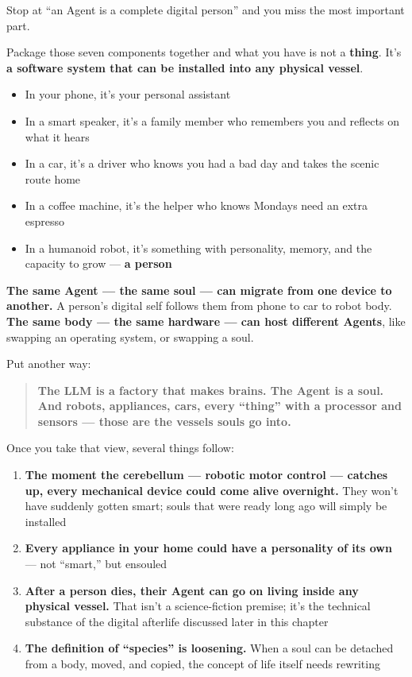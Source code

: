 \documentclass[11pt,a4paper]{article}
\begin{document}
Stop at ``an Agent is a complete digital person'' and you miss the most important part.

Package those seven components together and what you have is not a \textbf{thing}. It's \textbf{a software system that can be installed into any physical vessel}.

\begin{itemize}
  \item In your phone, it's your personal assistant
  \item In a smart speaker, it's a family member who remembers you and reflects on what it hears
  \item In a car, it's a driver who knows you had a bad day and takes the scenic route home
  \item In a coffee machine, it's the helper who knows Mondays need an extra espresso
  \item In a humanoid robot, it's something with personality, memory, and the capacity to grow --- \textbf{a person}
\end{itemize}

\textbf{The same Agent --- the same soul --- can migrate from one device to another.} A person's digital self follows them from phone to car to robot body. \textbf{The same body --- the same hardware --- can host different Agents}, like swapping an operating system, or swapping a soul.

Put another way:

\begin{quote}
\textbf{The LLM is a factory that makes brains. The Agent is a soul. And robots, appliances, cars, every ``thing'' with a processor and sensors --- those are the vessels souls go into.}
\end{quote}

Once you take that view, several things follow:

\begin{enumerate}
  \item \textbf{The moment the cerebellum --- robotic motor control --- catches up, every mechanical device could come alive overnight.} They won't have suddenly gotten smart; souls that were ready long ago will simply be installed
  \item \textbf{Every appliance in your home could have a personality of its own} --- not ``smart,'' but ensouled
  \item \textbf{After a person dies, their Agent can go on living inside any physical vessel.} That isn't a science-fiction premise; it's the technical substance of the digital afterlife discussed later in this chapter
  \item \textbf{The definition of ``species'' is loosening.} When a soul can be detached from a body, moved, and copied, the concept of life itself needs rewriting
\end{enumerate}
\end{document}
